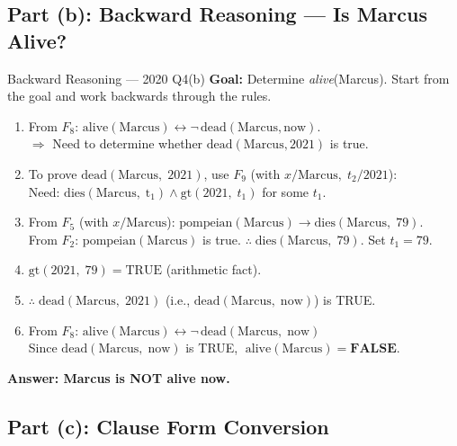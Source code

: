 \documentclass[12pt,a4paper]{article}
\newcommand{\ra}{\rightarrow}
\newcommand{\lra}{\leftrightarrow}
\begin{document}
\subsection{Part (b): Backward Reasoning --- Is Marcus Alive?}

\begin{solbox}{Backward Reasoning --- 2020 Q4(b)}
\textbf{Goal:} Determine \textit{alive}(Marcus).\quad
Start from the goal and work backwards through the rules.
\begin{enumerate}[noitemsep,label=\textbf{Step \arabic*.}]
  \item From $F_8$: $\mathrm{alive(Marcus)} \lra \neg\,\mathrm{dead(Marcus, now)}$.\\
        $\Rightarrow$ Need to determine whether $\mathrm{dead(Marcus, 2021)}$ is true.
  \item To prove $\mathrm{dead(Marcus,\;2021)}$, use $F_9$ (with $x/\mathrm{Marcus},\;t_2/2021$):\\
        Need: $\mathrm{dies(Marcus,\;t_1)} \land \mathrm{gt}(2021,\;t_1)$ for some $t_1$.
  \item From $F_5$ (with $x/\mathrm{Marcus}$): $\mathrm{pompeian(Marcus)} \ra \mathrm{dies(Marcus,\;79)}$.\\
        From $F_2$: $\mathrm{pompeian(Marcus)}$ is true.\quad
        $\therefore\;\mathrm{dies(Marcus,\;79)}$. \quad Set $t_1 = 79$.
  \item $\mathrm{gt}(2021,\;79) = \mathrm{TRUE}$ \quad (arithmetic fact).
  \item $\therefore\;\mathrm{dead(Marcus,\;2021)}$ (i.e., $\mathrm{dead(Marcus,\;now)}$) is TRUE.
  \item From $F_8$: $\mathrm{alive(Marcus)} \lra \neg\,\mathrm{dead(Marcus,\;now)}$\\
        Since $\mathrm{dead(Marcus,\;now)}$ is TRUE, $\;\mathrm{alive(Marcus)} = \mathbf{FALSE}$.
\end{enumerate}
\textbf{Answer: Marcus is NOT alive now.}
\end{solbox}

\subsection{Part (c): Clause Form Conversion}
\end{document}
